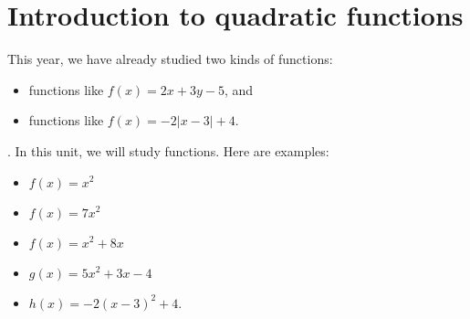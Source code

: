 

\section*{Introduction to quadratic functions}

This year, 
we have already studied two kinds of functions:
\begin{itemize}[itemsep=0in]
    \item {} functions like $f(x) = 2x + 3y - 5$, and
    \item {} functions like $f(x) = -2|x-3| + 4$.
\end{itemize}.
In this unit, we will study 
 functions.
Here are examples:
\begin{itemize}
    \item $f(x) = x^2$
    \item $f(x) = 7x^2$
    \item $f(x) = x^2 + 8x$
    \item $g(x) = 5x^2 + 3x - 4$
    \item $h(x) = -2(x-3)^2 + 4$.
\end{itemize}
